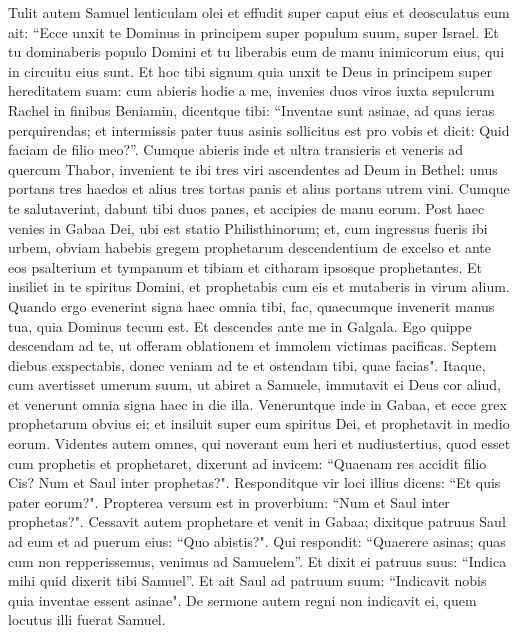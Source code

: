\begin{biblechapter}  
\verse Tulit autem Samuel lenticulam olei et effudit super caput eius et deosculatus eum ait: “Ecce unxit te Dominus in principem super populum suum, super Israel. Et tu dominaberis populo Domini et tu liberabis eum de manu inimicorum eius, qui in circuitu eius sunt. Et hoc tibi signum quia unxit te Deus in principem super hereditatem suam: 
\verse cum abieris hodie a me, invenies duos viros iuxta sepulcrum Rachel in finibus Beniamin, dicentque tibi: “Inventae sunt asinae, ad quas ieras perquirendas; et intermissis pater tuus asinis sollicitus est pro vobis et dicit: Quid faciam de filio meo?”. 
\verse Cumque abieris inde et ultra transieris et veneris ad quercum Thabor, invenient te ibi tres viri ascendentes ad Deum in Bethel: unus portans tres haedos et alius tres tortas panis et alius portans utrem vini. 
\verse Cumque te salutaverint, dabunt tibi duos panes, et accipies de manu eorum. 
\verse Post haec venies in Gabaa Dei, ubi est statio Philisthinorum; et, cum ingressus fueris ibi urbem, obviam habebis gregem prophetarum descendentium de excelso et ante eos psalterium et tympanum et tibiam et citharam ipsosque prophetantes. 
\verse Et insiliet in te spiritus Domini, et prophetabis cum eis et mutaberis in virum alium. 
\verse Quando ergo evenerint signa haec omnia tibi, fac, quaecumque invenerit manus tua, quia Dominus tecum est. 
\verse Et descendes ante me in Galgala. Ego quippe descendam ad te, ut offeram oblationem et immolem victimas pacificas. Septem diebus exspectabis, donec veniam ad te et ostendam tibi, quae facias". 
\verse Itaque, cum avertisset umerum suum, ut abiret a Samuele, immutavit ei Deus cor aliud, et venerunt omnia signa haec in die illa. 
\verse Veneruntque inde in Gabaa, et ecce grex prophetarum obvius ei; et insiluit super eum spiritus Dei, et prophetavit in medio eorum. 
\verse Videntes autem omnes, qui noverant eum heri et nudiustertius, quod esset cum prophetis et prophetaret, dixerunt ad invicem: “Quaenam res accidit filio Cis? Num et Saul inter prophetas?". 
\verse Responditque vir loci illius dicens: “Et quis pater eorum?". Propterea versum est in proverbium: “Num et Saul inter prophetas?". 
\verse Cessavit autem prophetare et venit in Gabaa; 
\verse dixitque patruus Saul ad eum et ad puerum eius: “Quo abistis?". Qui respondit: “Quaerere asinas; quas cum non repperissemus, venimus ad Samuelem”. 
\verse Et dixit ei patruus suus: “Indica mihi quid dixerit tibi Samuel”. 
\verse Et ait Saul ad patruum suum: “Indicavit nobis quia inventae essent asinae". De sermone autem regni non indicavit ei, quem locutus illi fuerat Samuel. 

\end{biblechapter}
